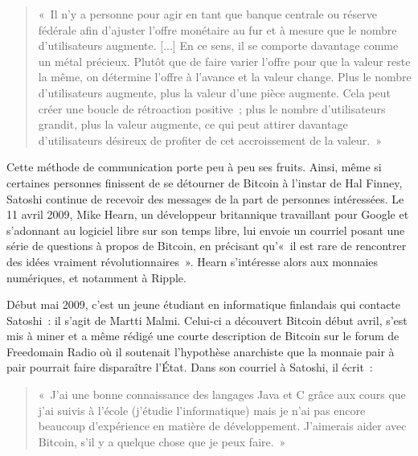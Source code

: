 \begin{quote}
«~Il n'y a personne pour agir en tant que banque centrale ou réserve fédérale afin d'ajuster l'offre monétaire au fur et à mesure que le nombre d'utilisateurs augmente. [...] En ce sens, il se comporte davantage comme un métal précieux. Plutôt que de faire varier l'offre pour que la valeur reste la même, on détermine l'offre à l'avance et la valeur change. Plus le nombre d'utilisateurs augmente, plus la valeur d'une pièce augmente. Cela peut créer une boucle de rétroaction positive~; plus le nombre d'utilisateurs grandit, plus la valeur augmente, ce qui peut attirer davantage d'utilisateurs désireux de profiter de cet accroissement de la valeur.~»
\end{quote}


Cette méthode de communication porte peu à peu ses fruits. Ainsi, même si certaines personnes finissent de se détourner de Bitcoin à l'instar de Hal Finney, Satoshi continue de recevoir des messages de la part de personnes intéressées. Le 11 avril 2009, Mike Hearn, un développeur britannique travaillant pour Google et s'adonnant au logiciel libre sur son temps libre, lui envoie un courriel posant une série de questions à propos de Bitcoin, en précisant qu'«~il est rare de rencontrer des idées vraiment révolutionnaires~». Hearn s'intéresse alors aux monnaies numériques, et notamment à Ripple.

Début mai 2009, c'est un jeune étudiant en informatique finlandais qui contacte Satoshi~: il s'agit de Martti Malmi. Celui-ci a découvert Bitcoin début avril, s'est mis à miner et a même rédigé une courte description de Bitcoin sur le forum de Freedomain Radio où il soutenait l'hypothèse anarchiste que la monnaie pair à pair pourrait faire disparaître l'État. Dans son courriel à Satoshi, il écrit~:

\begin{quote}
«~J'ai une bonne connaissance des langages Java et C grâce aux cours que j'ai suivis à l'école (j'étudie l'informatique) mais je n'ai pas encore beaucoup d'expérience en matière de développement. J'aimerais aider avec Bitcoin, s'il y a quelque chose que je peux faire.~»
\end{quote}

